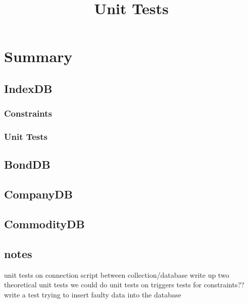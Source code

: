 \documentclass[12pt]{article}
\begin{document}
\renewcommand{\baselinestretch}{1.15} %
\setlength{\parindent}{0pt} %
\setlength{\parskip}{0.8em} %

\title{Unit Tests}
\maketitle

\section{Summary}

\subsection{IndexDB}

\subsubsection{Constraints}

\subsubsection{Unit Tests}

\subsection{BondDB}

\subsection{CompanyDB}

\subsection{CommodityDB}

\subsection{notes}

unit tests on connection script between collection/database
write up two theoretical unit tests we could do
unit tests on triggers
tests for constraints??
write a test trying to insert faulty data into the database
\end{document}
